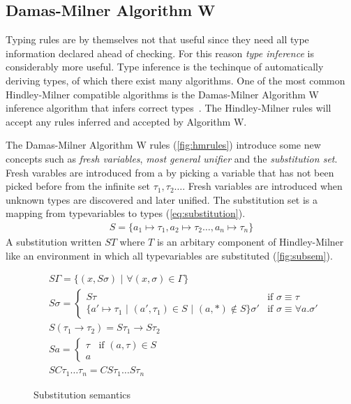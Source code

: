 \documentclass[11pt,oneside,a4paper]{report}
\begin{document}
\subsection{Damas-Milner Algorithm W}
Typing rules are by themselves not that useful since they need all type information declared ahead of checking.
For this reason \textit{type inference} is considerably more useful.
Type inference is the techinque of automatically deriving types, of which there exist many algorithms.
One of the most common Hindley-Milner compatible algorithms is the Damas-Milner Algorithm W inference algorithm that infers correct types~\cite{damas1984type,damas1982principal}.
The Hindley-Milner rules will accept any rules inferred and accepted by Algorithm W.

The Damas-Milner Algorithm W rules (\autoref{fig:hmrules}) introduce some new concepts such as \textit{fresh variables}, \textit{most general unifier} and the \textit{substitution set}.
Fresh varables are introduced from a by picking a variable that has not been picked before from the infinite set $\tau_1, \tau_2 \dots $.
Fresh variables are introduced when unknown types are discovered and later unified.
The substitution set is a mapping from typevariables to types (\autoref{eq:substitution}).
\begin{align}
    S = \{ a_1 \mapsto \tau_1, a_2 \mapsto \tau_2 \dots , a_n \mapsto \tau_n \} 
    \label{eq:substitution}
\end{align}
A substitution written $S T$ where $T$ is an arbitary component of Hindley-Milner like an environment in which all typevariables are substituted (\autoref{fig:subsem}).
\begin{figure}
\begin{mdframed}
\begin{align}
    &S \Gamma = \{ (x, S \sigma) \,\,|\,\, \forall (x, \sigma) \in \Gamma \} \tag{Environment}\\
    &S \sigma  = 
        \begin{cases}
            S \tau & \text{if } \sigma \equiv \tau\\
            \{ a' \mapsto \tau_1 \,\,|\,\, (a', \tau_1) \in S \,\,|\,\, (a, *) \notin S \} \sigma' & \text{if } \sigma \equiv \forall a . \sigma'
        \end{cases}
    \tag{Poly}\\
    &S (\tau_1 \rightarrow \tau_2) = S\tau_1 \rightarrow S\tau_2 \tag{Arrow}\\
    &S a = 
        \begin{cases}
            \tau & \text{if } (a, \tau) \in S\\
            a & 
        \end{cases}
    \tag{Typevariable}\\
    &S C \tau_1 \dots \tau_n = C S\tau_1 \dots S\tau_n \tag{Type constructor}
\end{align}
\end{mdframed}
    \caption{Substitution semantics}
    \label{fig:subsem}
\end{figure}
\end{document}
